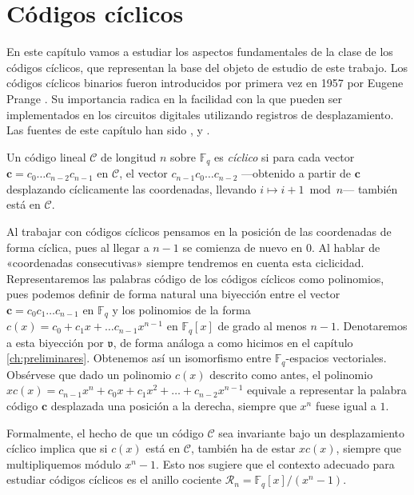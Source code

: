 
\chapter{Códigos cíclicos}

En este capítulo vamos a estudiar los aspectos fundamentales de la clase de los códigos cíclicos, que representan la base del objeto de estudio de este trabajo.
Los códigos cíclicos binarios fueron introducidos por primera vez en 1957 por Eugene Prange \parencite{prange_cyclic_1957}.
Su importancia radica en la facilidad con la que pueden ser implementados en los circuitos digitales utilizando registros de desplazamiento.
Las fuentes de este capítulo han sido \parencite{huffman_fundamentals_2003}, \parencite{kelbert_information_2013} y \parencite{macwilliams_theory_1977}.

\begin{definition}
  Un código lineal \(\mathcal C\) de longitud \(n\) sobre \(\mathbb F_q\) es \textit{cíclico} si para cada vector \(\mathbf c = c_0\dots c_{n-2}c_{n-1}\) en \(\mathcal C\), el vector \(c_{n-1}c_0\dots c_{n-2}\) —obtenido a partir de \(\mathbf c\) desplazando cíclicamente las coordenadas, llevando \(i \mapsto i +1 \bmod n\)— también está en \(\mathcal C\).
\end{definition}

Al trabajar con códigos cíclicos pensamos en la posición de las coordenadas de forma cíclica, pues al llegar a \(n -1\) se comienza de nuevo en \(0\).
Al hablar de «coordenadas consecutivas» siempre tendremos en cuenta esta ciclicidad.
Representaremos las palabras código de los códigos cíclicos como polinomios, pues podemos definir de forma natural una biyección entre el vector \(\mathbf c = c_0c_1\dots c_{n-1}\) en \(\mathbb F_q\) y los polinomios de la forma \(c(x) = c_0 + c_1x + \dots c_{n-1}x^{n-1}\) en \(\mathbb F_q[x]\) de grado al menos \(n-1\).
Denotaremos a esta biyección por \(\mathfrak v\), de forma análoga a como hicimos en el capítulo \ref{ch:preliminares}.
Obtenemos así un isomorfismo entre \(\mathbb F_q\)-espacios vectoriales.
Obsérvese que dado un polinomio \(c(x)\) descrito como antes, el polinomio \(xc(x) = c_{n-1}x^n + c_0x + c_1x^2 + \dots + c_{n-2}x^{n-1}\) equivale a representar la palabra código \(\mathbf c\) desplazada una posición a la derecha, siempre que \(x^n\) fuese igual a \(1\).

Formalmente, el hecho de que un código \(\mathcal C\) sea invariante bajo un desplazamiento cíclico implica que si \(c(x)\) está en \(\mathcal C\), también ha de estar \(xc(x)\), siempre que multipliquemos módulo \(x^n -1\). 
Esto nos sugiere que el contexto adecuado para estudiar códigos cíclicos es el anillo cociente \(\mathcal R_n = \mathbb F_q[x]/(x^n - 1)\).

